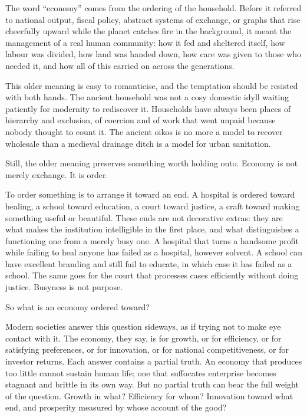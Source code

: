 \documentclass[11pt,a4paper,oneside]{book}
\begin{document}
The word ``economy'' comes from the ordering of the household. Before it referred to national output, fiscal policy, abstract systems of exchange, or graphs that rise cheerfully upward while the planet catches fire in the background, it meant the management of a real human community: how it fed and sheltered itself, how labour was divided, how land was handed down, how care was given to those who needed it, and how all of this carried on across the generations.

This older meaning is easy to romanticise, and the temptation should be resisted with both hands. The ancient household was not a cosy domestic idyll waiting patiently for modernity to rediscover it. Households have always been places of hierarchy and exclusion, of coercion and of work that went unpaid because nobody thought to count it. The ancient oikos is no more a model to recover wholesale than a medieval drainage ditch is a model for urban sanitation.

Still, the older meaning preserves something worth holding onto. Economy is not merely exchange. It is order.

To order something is to arrange it toward an end. A hospital is ordered toward healing, a school toward education, a court toward justice, a craft toward making something useful or beautiful. These ends are not decorative extras: they are what makes the institution intelligible in the first place, and what distinguishes a functioning one from a merely busy one. A hospital that turns a handsome profit while failing to heal anyone has failed as a hospital, however solvent. A school can have excellent branding and still fail to educate, in which case it has failed as a school. The same goes for the court that processes cases efficiently without doing justice. Busyness is not purpose.

So what is an economy ordered toward?

Modern societies answer this question sideways, as if trying not to make eye contact with it. The economy, they say, is for growth, or for efficiency, or for satisfying preferences, or for innovation, or for national competitiveness, or for investor returns. Each answer contains a partial truth. An economy that produces too little cannot sustain human life; one that suffocates enterprise becomes stagnant and brittle in its own way. But no partial truth can bear the full weight of the question. Growth in what? Efficiency for whom? Innovation toward what end, and prosperity measured by whose account of the good?
\end{document}

